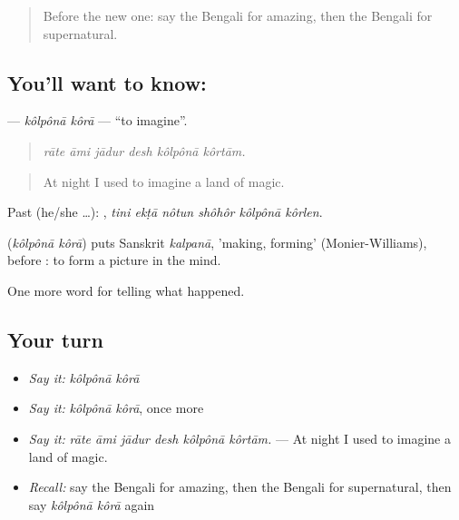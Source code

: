 \begin{quote}
Before the new one: say the Bengali for amazing, then the Bengali for supernatural.
\end{quote}

\subsection*{You'll want to know:  }
\textbf{ } — \emph{kôlpônā kôrā} — \textquotedblleft{}to imagine\textquotedblright{}.

\begin{quote}
     
\end{quote}

\begin{quote}
\emph{rāte āmi jādur desh kôlpônā kôrtām.}
\end{quote}

\begin{quote}
At night I used to imagine a land of magic.
\end{quote}

Past (he/she …):      , \emph{tini ekṭā nôtun shôhôr kôlpônā kôrlen}.

\begin{cousinweb}
\textbf{ } (\emph{kôlpônā kôrā}) puts Sanskrit \emph{kalpanā}, 'making, forming' (Monier-Williams), before : to form a picture in the mind.
\end{cousinweb}

\begin{grammarlens}[title={What you've built}]
One more word for telling what happened.
\end{grammarlens}

\subsection*{Your turn}
\begin{itemize}
\raggedright
  \item \emph{Say it:} \emph{kôlpônā kôrā}
  \item \emph{Say it:} \emph{kôlpônā kôrā}, once more
  \item \emph{Say it:} \emph{rāte āmi jādur desh kôlpônā kôrtām.} — At night I used to imagine a land of magic.
  \item \emph{Recall:} say the Bengali for amazing, then the Bengali for supernatural, then say \emph{kôlpônā kôrā} again
\end{itemize}

